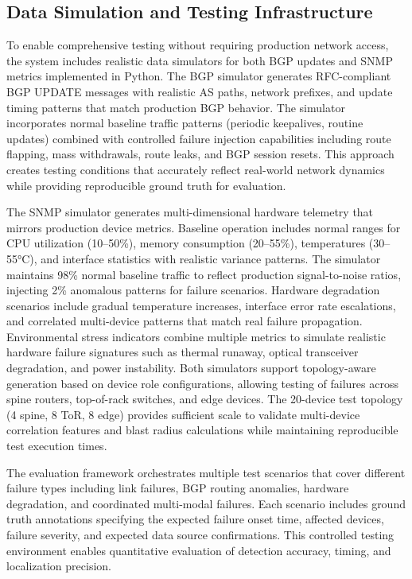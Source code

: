 \documentclass[11pt]{article}
\begin{document}
\subsection{Data Simulation and Testing Infrastructure}

To enable comprehensive testing without requiring production network access, the system includes realistic data simulators for both BGP updates and SNMP metrics implemented in Python. The BGP simulator generates RFC-compliant BGP UPDATE messages with realistic AS paths, network prefixes, and update timing patterns that match production BGP behavior. The simulator incorporates normal baseline traffic patterns (periodic keepalives, routine updates) combined with controlled failure injection capabilities including route flapping, mass withdrawals, route leaks, and BGP session resets. This approach creates testing conditions that accurately reflect real-world network dynamics while providing reproducible ground truth for evaluation.

The SNMP simulator generates multi-dimensional hardware telemetry that mirrors production device metrics. Baseline operation includes normal ranges for CPU utilization (10--50\%), memory consumption (20--55\%), temperatures (30--55°C), and interface statistics with realistic variance patterns. The simulator maintains 98\% normal baseline traffic to reflect production signal-to-noise ratios, injecting 2\% anomalous patterns for failure scenarios. Hardware degradation scenarios include gradual temperature increases, interface error rate escalations, and correlated multi-device patterns that match real failure propagation. Environmental stress indicators combine multiple metrics to simulate realistic hardware failure signatures such as thermal runaway, optical transceiver degradation, and power instability. Both simulators support topology-aware generation based on device role configurations, allowing testing of failures across spine routers, top-of-rack switches, and edge devices. The 20-device test topology (4 spine, 8 ToR, 8 edge) provides sufficient scale to validate multi-device correlation features and blast radius calculations while maintaining reproducible test execution times.

The evaluation framework orchestrates multiple test scenarios that cover different failure types including link failures, BGP routing anomalies, hardware degradation, and coordinated multi-modal failures. Each scenario includes ground truth annotations specifying the expected failure onset time, affected devices, failure severity, and expected data source confirmations. This controlled testing environment enables quantitative evaluation of detection accuracy, timing, and localization precision.
\end{document}
